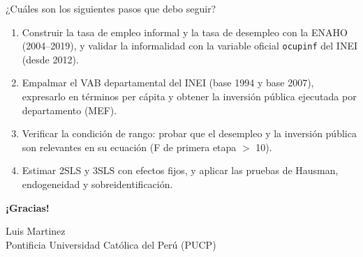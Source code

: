 \documentclass[serif, aspectratio=169]{beamer}
\begin{document}
\begin{frame}{¿Cuáles son los siguientes pasos que debo seguir?}
\begin{enumerate}
  \item[\textbf{01}] Construir la tasa de empleo informal y la tasa de desempleo con la ENAHO (2004--2019), y validar la informalidad con la variable oficial \texttt{ocupinf} del INEI (desde 2012).
  \item[\textbf{02}] Empalmar el VAB departamental del INEI (base 1994 y base 2007), expresarlo en términos per cápita y obtener la inversión pública ejecutada por departamento (MEF).
  \item[\textbf{03}] Verificar la condición de rango: probar que el desempleo y la inversión pública son relevantes en su ecuación (F de primera etapa $>$ 10).
  \item[\textbf{04}] Estimar 2SLS y 3SLS con efectos fijos, y aplicar las pruebas de Hausman, endogeneidad y sobreidentificación.
\end{enumerate}
\end{frame}

\begin{frame}
\centering
\vfill
{\Huge \textbf{¡Gracias!}}

\vspace{0.8cm}
{\large Luis Martinez}\\[4pt]
{\small Pontificia Universidad Católica del Perú (PUCP)}
\vfill
\end{frame}
\end{document}
